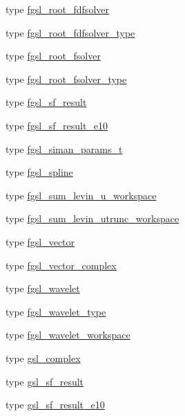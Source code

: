 \begin{DoxyCompactItemize}
type \hyperlink{structfgsl_1_1fgsl__root__fdfsolver}{fgsl\-\_\-root\-\_\-fdfsolver}
\item 
type \hyperlink{structfgsl_1_1fgsl__root__fdfsolver__type}{fgsl\-\_\-root\-\_\-fdfsolver\-\_\-type}
\item 
type \hyperlink{structfgsl_1_1fgsl__root__fsolver}{fgsl\-\_\-root\-\_\-fsolver}
\item 
type \hyperlink{structfgsl_1_1fgsl__root__fsolver__type}{fgsl\-\_\-root\-\_\-fsolver\-\_\-type}
\item 
type \hyperlink{structfgsl_1_1fgsl__sf__result}{fgsl\-\_\-sf\-\_\-result}
\item 
type \hyperlink{structfgsl_1_1fgsl__sf__result__e10}{fgsl\-\_\-sf\-\_\-result\-\_\-e10}
\item 
type \hyperlink{structfgsl_1_1fgsl__siman__params__t}{fgsl\-\_\-siman\-\_\-params\-\_\-t}
\item 
type \hyperlink{structfgsl_1_1fgsl__spline}{fgsl\-\_\-spline}
\item 
type \hyperlink{structfgsl_1_1fgsl__sum__levin__u__workspace}{fgsl\-\_\-sum\-\_\-levin\-\_\-u\-\_\-workspace}
\item 
type \hyperlink{structfgsl_1_1fgsl__sum__levin__utrunc__workspace}{fgsl\-\_\-sum\-\_\-levin\-\_\-utrunc\-\_\-workspace}
\item 
type \hyperlink{structfgsl_1_1fgsl__vector}{fgsl\-\_\-vector}
\item 
type \hyperlink{structfgsl_1_1fgsl__vector__complex}{fgsl\-\_\-vector\-\_\-complex}
\item 
type \hyperlink{structfgsl_1_1fgsl__wavelet}{fgsl\-\_\-wavelet}
\item 
type \hyperlink{structfgsl_1_1fgsl__wavelet__type}{fgsl\-\_\-wavelet\-\_\-type}
\item 
type \hyperlink{structfgsl_1_1fgsl__wavelet__workspace}{fgsl\-\_\-wavelet\-\_\-workspace}
\item 
type \hyperlink{structfgsl_1_1gsl__complex}{gsl\-\_\-complex}
\item 
type \hyperlink{structfgsl_1_1gsl__sf__result}{gsl\-\_\-sf\-\_\-result}
\item 
type \hyperlink{structfgsl_1_1gsl__sf__result__e10}{gsl\-\_\-sf\-\_\-result\-\_\-e10}
\end{DoxyCompactItemize}
